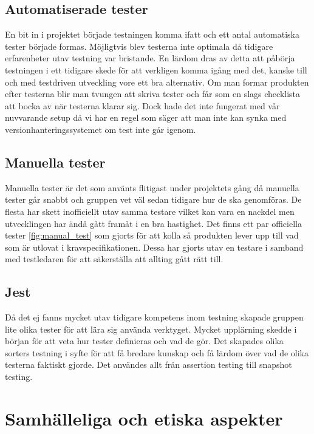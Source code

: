 \subsection{Automatiserade tester}
 En bit in i projektet började testningen komma ifatt och ett antal automatiska tester började formas. Möjligtvis blev testerna inte optimala då tidigare erfarenheter utav testning var bristande. En lärdom dras av detta att påbörja testningen i ett tidigare skede för att verkligen komma igång med det, kanske till och med testdriven utveckling \cite{TDD} vore ett bra alternativ. Om man formar produkten efter testerna blir man tvungen att skriva tester och får som en slags checklista att bocka av när testerna klarar sig. Dock hade det inte fungerat med vår nuvvarande setup då vi har en regel som säger att man inte kan synka med versionhanteringssystemet om test inte går igenom. 

\subsection{Manuella tester}
Manuella tester är det som använts flitigast under projektets gång då manuella tester går snabbt och gruppen vet väl sedan tidigare hur de ska genomföras. De flesta har skett inofficiellt utav samma testare vilket kan vara en nackdel men utvecklingen har ändå gått framåt i en bra hastighet. Det finns ett par officiella tester \ref{fig:manual_test} som gjorts för att kolla så produkten lever upp till vad som är utlovat i kravspecifikationen. Dessa har gjorts utav en testare i samband med testledaren för att säkerställa att allting gått rätt till.

\subsection{Jest}
Då det ej fanns mycket utav tidigare kompetens inom testning skapade gruppen lite olika tester för att lära sig använda verktyget. Mycket upplärning skedde i början för att veta hur tester definieras och vad de gör. Det skapades olika sorters testning i syfte för att få bredare kunskap och få lärdom över vad de olika testerna faktiskt gjorde. Det användes allt från assertion testing\cite{assertion-testing} till snapshot testing\cite{snapshot-testing}.



\section{Samhälleliga och etiska aspekter}
\label{sec:work-wider-context}

